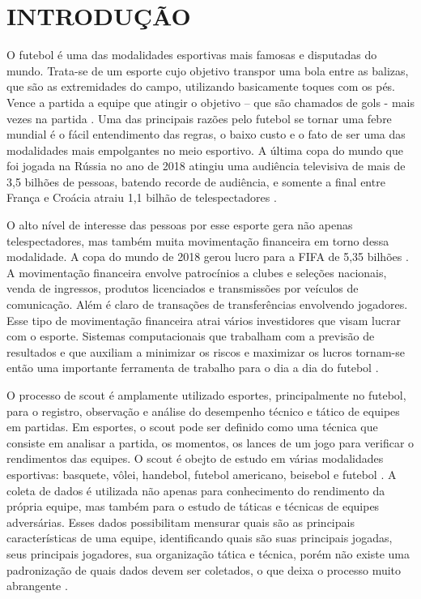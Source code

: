\newpage
\section{INTRODUÇÃO}
O futebol é uma das modalidades esportivas mais famosas e disputadas do mundo. Trata-se de um esporte cujo objetivo transpor uma bola entre as balizas, que são as extremidades do campo, utilizando basicamente toques com os pés. Vence a partida a equipe que atingir o objetivo – que são chamados de gols - mais vezes na partida \cite{Sfeir2011}. Uma das principais razões pelo futebol se tornar uma febre mundial é o fácil entendimento das regras, o baixo custo e o fato de ser uma das modalidades mais empolgantes no meio esportivo. A última copa do mundo que foi jogada na Rússia no ano de 2018 atingiu uma audiência televisiva de mais de 3,5 bilhões de pessoas, batendo recorde de audiência, e somente a final entre França e Croácia atraiu 1,1 bilhão de telespectadores \cite{Chade2018}.

O alto nível de interesse das pessoas por esse esporte gera não apenas telespectadores, mas também muita movimentação financeira em torno dessa modalidade. A copa do mundo de 2018 gerou lucro para a FIFA de 5,35 bilhões \cite{FIFA2018}. A movimentação financeira envolve patrocínios a clubes e seleções nacionais, venda de ingressos, produtos licenciados e transmissões por veículos de comunicação. Além é claro de transações de transferências envolvendo jogadores. Esse tipo de movimentação financeira atrai vários investidores que visam lucrar com o esporte. Sistemas computacionais que trabalham com a previsão de resultados e que auxiliam a minimizar os riscos e maximizar os lucros tornam-se então uma importante ferramenta de trabalho para o dia a dia do futebol \cite{Perin2013}.

O processo de scout é amplamente utilizado esportes, principalmente no futebol, para o registro, observação e análise do desempenho técnico e tático de equipes em partidas. Em esportes, o scout pode ser definido como uma técnica que consiste em analisar a partida, os momentos, os lances de um jogo para verificar o rendimentos das equipes. O scout é obejto de estudo em várias modalidades esportivas: basquete, vôlei, handebol, futebol americano, beisebol e futebol \cite{Martins2017}. A coleta de dados é utilizada não apenas para conhecimento do rendimento da própria equipe, mas também para o estudo de táticas e técnicas de equipes adversárias. Esses dados possibilitam mensurar quais são as principais características de uma equipe, identificando quais são suas principais jogadas, seus principais jogadores, sua organização tática e técnica, porém não existe uma padronização de quais dados devem ser coletados, o que deixa o processo muito abrangente \cite{Duarte2015}.

